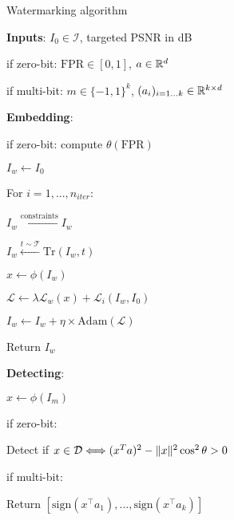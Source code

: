 \begin{algorithm}
\caption{Watermarking algorithm}\label{chap1/alg:0bit}
\begin{algorithmic}
\item \textbf{Inputs}: $I_0 \in \mathcal{I}$, targeted PSNR in dB
    \item \quad if zero-bit: $ \textrm{FPR} \in [0,1]$, $a \in \mathbb{R}^d$
    \item \quad if multi-bit: $m \in \{-1,1\}^k$, $(a_i)_{i=1...k} \in \mathbb{R}^{k\times d}$
\item \textbf{Embedding}: 
    \item \quad if zero-bit: compute $\theta (\textrm{FPR})$
    \item \quad $I_w \gets I_0$
    \item \quad For $i=1, ..., n_{iter}$:
    \item \quad \quad $I_w \xleftarrow{\textrm{constraints}} I_w$ 
    \item \quad \quad $I_w \xleftarrow{t \sim \mathcal T} \textrm{Tr}(I_w, t)$ 
    \item \quad \quad $x \gets \phi (I_w)$ 
    \item \quad \quad $\mathcal{L} \gets \lambda \mathcal L_w(x) + \mathcal L_i(I_w, I_0) $ 
    \item \quad \quad $I_w \gets I_w + \eta \times \mathrm{Adam}(\mathcal{L})$ 
    \item \quad Return $I_w$
\item \textbf{Detecting}: 
    \item \quad $x \gets \phi(I_m)$
    \item \quad if zero-bit:
    \item \quad \quad Detect if $x\in \mathcal D \Longleftrightarrow (x^Ta)^2-\lVert{x}\rVert^2\cos^2\theta >0$
    \item \quad if multi-bit:
    \item \quad \quad Return $\left[\mathrm{sign}\left(x^\top a_1\right), ..., \mathrm{sign}\left(x^\top a_k\right)\right]$
\end{algorithmic}
\end{algorithm}
